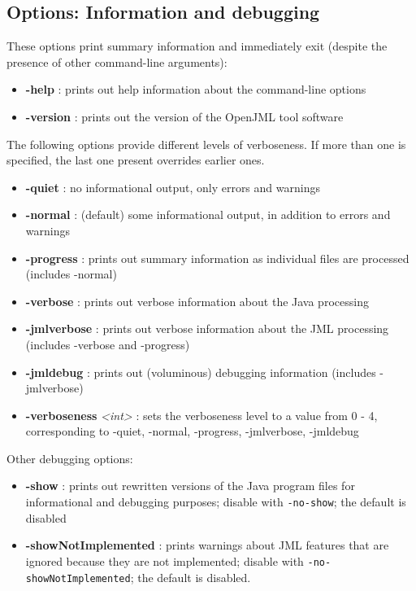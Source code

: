 \documentclass{report}%
\begin{document}
\subsection{Options: Information and debugging}
\label{OptionsDebugging}
These options print summary information and immediately exit (despite the presence of other command-line arguments):
\begin{itemize}
\item \textbf{-help} : prints out help information about the command-line options
\item \textbf{-version} : prints out the version of the OpenJML tool software
\end{itemize}
The following options provide different levels of verboseness. If more than one is specified, the last one present overrides earlier ones.
\begin{itemize}
\item \textbf{-quiet} : no informational output, only errors and warnings
\item \textbf{-normal} : (default) some informational output, in addition to errors and warnings
\item \textbf{-progress} : prints out summary information as individual files are processed (includes -normal)
\item \textbf{-verbose} : prints out verbose information about the Java processing
\item \textbf{-jmlverbose} : prints out verbose information about the JML processing (includes -verbose and -progress)
\item \textbf{-jmldebug} : prints out (voluminous) debugging information (includes -jmlverbose)
\item \textbf{-verboseness} {\it <int>} : sets the verboseness level to a value from 0 - 4, corresponding to -quiet, -normal, -progress, -jmlverbose, -jmldebug
\end{itemize}

Other debugging options:
\begin{itemize}
\item \textbf{-show} : prints out rewritten versions of the Java program files for informational and debugging purposes; disable
with \texttt{-no-show}; the default is disabled
\item \textbf{-showNotImplemented} : prints warnings about JML features that are ignored because they are not implemented; 
disable with \texttt{-no-showNotImplemented}; the default is disabled.
\end{itemize}
\end{document}
